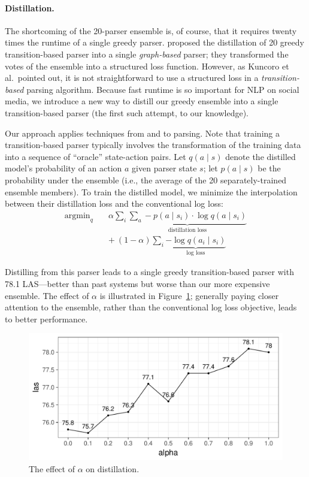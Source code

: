 \documentclass[11pt,a4paper]{article}
\DeclareMathOperator*{\argmin}{argmin}
\begin{document}
\paragraph{Distillation.}  The shortcoming of the 20-parser ensemble is, of
course, that it requires twenty times the runtime of a single greedy
parser.   proposed the distillation of 20
greedy transition-based parser into a single \emph{graph-based}
parser; they transformed the votes of the ensemble into a structured
loss function.  However, as Kuncoro et al.~pointed out, 
it is not straightforward to use a structured
loss in a \emph{transition-based} parsing algorithm.  Because fast
runtime is so important for NLP on social media, we
introduce a new way to distill our greedy ensemble into a single
transition-based parser (the first such attempt, to our knowledge).  

Our approach applies techniques from 
and  to parsing.
Note that training a transition-based parser typically involves the
transformation of the training data into a sequence of ``oracle'' state-action
pairs.
Let $q(a \mid s)$ denote the distilled model's
probability of an action $a$ given parser state $s$; let $p(a\mid s)$ be the probability under the
ensemble (i.e., the average of the 20 separately-trained ensemble
members).
To train the distilled model, we minimize the interpolation between
their distillation loss and the conventional log loss:
\begin{align}
{\argmin}_q \quad  & \alpha \sum_i \underbrace{\sum_{a} -p(a
	\mid s_i) \cdot \log q(a \mid s_i)}_{\text{distillation loss}} \\
& +\ (1 - \alpha) \sum_i \underbrace{- \log q(a_i \mid
  s_i)}_{\text{log loss}} \nonumber
\end{align}

Distilling from this 
parser leads to a single greedy transition-based parser with 78.1
LAS---better than past systems but worse than our more expensive ensemble.
The effect of $\alpha$ is illustrated in
Figure~\ref{fig:effect-alpha}; generally paying closer attention to
the ensemble, rather than the conventional log loss objective, leads
to better performance.

\begin{figure}[t]
	\centering
	\includegraphics[width=\columnwidth,trim={0.3cm 0 0 0},clip]{graphics/alpha}
	\caption{The effect of $\alpha$ on distillation. \label{fig:effect-alpha}}
\end{figure}
\end{document}
